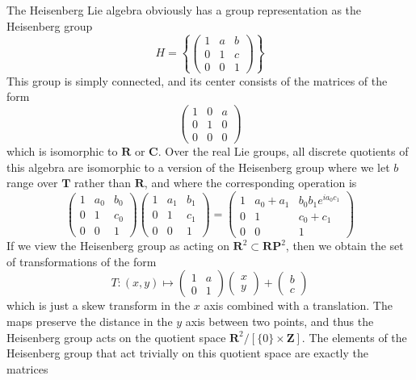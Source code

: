 The Heisenberg Lie algebra obviously has a group representation as the Heisenberg group
%
\[ H = \left\{ \begin{pmatrix} 1 & a & b \\ 0 & 1 & c \\ 0 & 0 & 1 \end{pmatrix} \right\} \]
%
This group is simply connected, and its center consists of the matrices of the form
%
\[ \begin{pmatrix} 1 & 0 & a \\ 0 & 1 & 0 \\ 0 & 0 & 0 \end{pmatrix} \]
%
which is isomorphic to $\mathbf{R}$ or $\mathbf{C}$. Over the real Lie groups, all discrete quotients of this algebra are isomorphic to a version of the Heisenberg group where we let $b$ range over $\mathbf{T}$ rather than $\mathbf{R}$, and where the corresponding operation is
%
\[ \begin{pmatrix} 1 & a_0 & b_0 \\ 0 & 1 & c_0 \\ 0 & 0 & 1 \end{pmatrix} \begin{pmatrix} 1 & a_1 & b_1 \\ 0 & 1 & c_1 \\ 0 & 0 & 1 \end{pmatrix} = \begin{pmatrix} 1 & a_0 + a_1 & b_0b_1e^{ia_0c_1} \\ 0 & 1 & c_0 + c_1 \\ 0 & 0 & 1 \end{pmatrix} \]
%
If we view the Heisenberg group as acting on $\mathbf{R}^2 \subset \mathbf{RP}^2$, then we obtain the set of transformations of the form
%
\[ T: (x,y) \mapsto \begin{pmatrix} 1 & a \\ 0 & 1 \end{pmatrix} \begin{pmatrix} x \\ y \end{pmatrix} + \begin{pmatrix} b \\ c \end{pmatrix} \]
%
which is just a skew transform in the $x$ axis combined with a translation. The maps preserve the distance in the $y$ axis between two points, and thus the Heisenberg group acts on the quotient space $\mathbf{R}^2/[\{ 0 \} \times \mathbf{Z}]$. The elements of the Heisenberg group that act trivially on this quotient space are exactly the matrices
